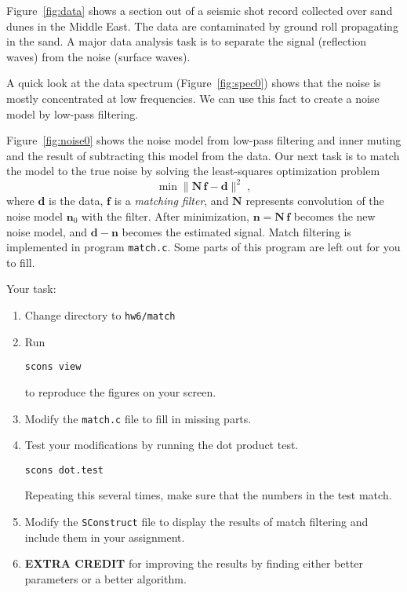 
Figure~\ref{fig:data} shows a section out of a seismic shot record
collected over sand dunes in the Middle East. The data are
contaminated by ground roll propagating in the sand. A major data
analysis task is to separate the signal (reflection waves) from the
noise (surface waves).


A quick look at the data spectrum (Figure~\ref{fig:spec0}) shows that the
noise is mostly concentrated at low frequencies. We can use this fact
to create a noise model by low-pass filtering.


Figure~\ref{fig:noise0} shows the noise model from low-pass filtering
and inner muting and the result of subtracting this model from the
data. Our next task is to match the model to the true noise by solving
the least-squares optimization problem
\begin{equation}
\label{eq:ls}
\min \|\mathbf{N}\,\mathbf{f} - \mathbf{d}\|^2\;,
\end{equation}
where $\mathbf{d}$ is the data, $\mathbf{f}$ is a \emph{matching filter}, and
$\mathbf{N}$ represents convolution of the noise model
$\mathbf{n}_0$ with the filter. After minimization, $\mathbf{n} =
\mathbf{N}\,\mathbf{f}$ becomes the new noise model, and
$\mathbf{d}-\mathbf{n}$ becomes the estimated signal. Match filtering
is implemented in program \texttt{match.c}. Some parts of this program
are left out for you to fill.

\lstset{language=c,numbers=left,numberstyle=\tiny,showstringspaces=false}


Your task:
\begin{enumerate}
\item Change directory to \texttt{hw6/match}
\item Run 
\begin{verbatim}
scons view
\end{verbatim}
to reproduce the figures on your screen.
\item Modify the \texttt{match.c} file to fill in missing parts.
\item Test your modifications by running the dot product test.
\begin{verbatim}
scons dot.test
\end{verbatim}
Repeating this several times, make sure that the numbers in the test match.
\item  Modify the \texttt{SConstruct} file to display the results of match filtering
and include them in your assignment.
\item \textbf{EXTRA CREDIT} for improving the results by finding either better parameters or a better algorithm. 
\end{enumerate}

